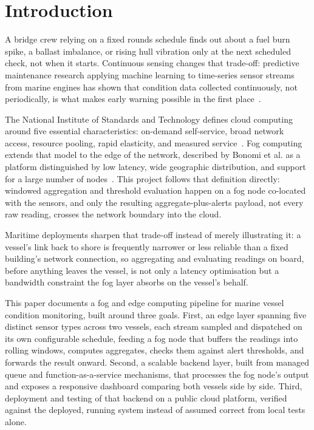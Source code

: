 \documentclass[conference]{IEEEtran}
\begin{document}
\section{Introduction}
A bridge crew relying on a fixed rounds schedule finds out about a fuel burn spike, a ballast imbalance, or rising hull vibration only at the next scheduled check, not when it starts. Continuous sensing changes that trade-off: predictive maintenance research applying machine learning to time-series sensor streams from marine engines has shown that condition data collected continuously, not periodically, is what makes early warning possible in the first place~\cite{ref1}.

The National Institute of Standards and Technology defines cloud computing around five essential characteristics: on-demand self-service, broad network access, resource pooling, rapid elasticity, and measured service~\cite{ref2}. Fog computing extends that model to the edge of the network, described by Bonomi et al. as a platform distinguished by low latency, wide geographic distribution, and support for a large number of nodes~\cite{ref3}. This project follows that definition directly: windowed aggregation and threshold evaluation happen on a fog node co-located with the sensors, and only the resulting aggregate-plus-alerts payload, not every raw reading, crosses the network boundary into the cloud.

Maritime deployments sharpen that trade-off instead of merely illustrating it: a vessel's link back to shore is frequently narrower or less reliable than a fixed building's network connection, so aggregating and evaluating readings on board, before anything leaves the vessel, is not only a latency optimisation but a bandwidth constraint the fog layer absorbs on the vessel's behalf.

This paper documents a fog and edge computing pipeline for marine vessel condition monitoring, built around three goals. First, an edge layer spanning five distinct sensor types across two vessels, each stream sampled and dispatched on its own configurable schedule, feeding a fog node that buffers the readings into rolling windows, computes aggregates, checks them against alert thresholds, and forwards the result onward. Second, a scalable backend layer, built from managed queue and function-as-a-service mechanisms, that processes the fog node's output and exposes a responsive dashboard comparing both vessels side by side. Third, deployment and testing of that backend on a public cloud platform, verified against the deployed, running system instead of assumed correct from local tests alone.
\end{document}
